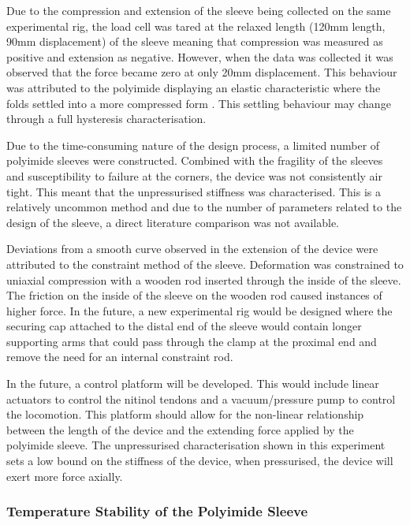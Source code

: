 Due to the compression and extension of the sleeve being collected on the same experimental rig, the load cell was tared at the relaxed length (120mm length, 90mm displacement) of the sleeve meaning that compression was measured as positive and extension as negative. However, when the data was collected it was observed that the force became zero at only 20mm displacement. This behaviour was attributed to the polyimide displaying an elastic characteristic where the folds settled into a more compressed form \cite{dharmadasa2020characterizing}. This settling behaviour may change through a full hysteresis characterisation. 

Due to the time-consuming nature of the design process, a limited number of polyimide sleeves were constructed. Combined with the fragility of the sleeves and susceptibility to failure at the corners, the device was not consistently air tight. This meant that the unpressurised stiffness was characterised. This is a relatively uncommon method and due to the number of parameters related to the design of the sleeve, a direct literature comparison was not available.

Deviations from a smooth curve observed in the extension of the device were attributed to the constraint method of the sleeve.  Deformation was constrained to uniaxial compression with a wooden rod inserted through the inside of the sleeve. The friction on the inside of the sleeve on the wooden rod caused instances of higher force. In the future, a new experimental rig would be designed where the securing cap attached to the distal end of the sleeve would contain longer supporting arms that could pass through the clamp at the proximal end and remove the need for an internal constraint rod.


In the future, a control platform will be developed. This would include linear actuators to control the nitinol tendons and a vacuum/pressure pump to control the locomotion. This platform should allow for the non-linear relationship between the length of the device and the extending force applied by the polyimide sleeve. The unpressurised characterisation shown in this experiment sets a low bound on the stiffness of the device, when pressurised, the device will exert more force axially.


\subsubsection{Temperature Stability of the Polyimide Sleeve}

